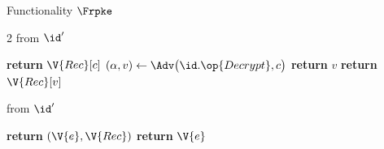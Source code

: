 \begin{interface}[nofloat]{Functionality $\Frpke$ \\
}
{\begin{multicols}{2}
 \quad from $\id'$
\begin{algorithmic}[1]
\algcont
{} \label{ln:rpkeowner}
  \State \textbf{return} $\V{Rec}[c]$ \label{ln:rpkecorrect}
\EndIf
\State $(\alpha, v) \gets \Adv\bigl(\id.\op{Decrypt}, c\bigr)$ \label{ln:rpkeadv}
  \State \textbf{return} $v$ \label{ln:rpkeplain}
\EndIf
{} \label{ln:rpkefind}
\State \textbf{return} $\V{Rec}[v]$ \label{ln:rpkereplay}
\algsave
\end{algorithmic}
\vspace{1.4ex}

 \quad from $\id'$
\begin{algorithmic}[1]
\algcont
{}
  \State \textbf{return} $(\V{e}, \V{Rec})$ \label{ln:rpkeleakowner}
\EndIf
\State \textbf{return} $\V{e}$ \label{ln:rpkeleakother}
\algsave
\end{algorithmic}
\end{multicols}}
\end{interface}
